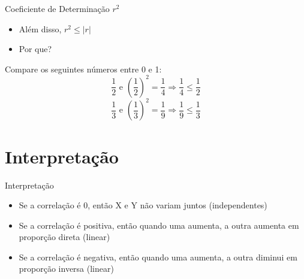 \documentclass{beamer}
\begin{document}
\begin{frame}{Coeficiente de Determinação $r^2$}
  \begin{itemize}
  \item Além disso, $r^2 \le |r|$
  \item Por que?
  \end{itemize}
  \begin{block}{}
    Compare os seguintes números entre 0 e 1:
    \begin{displaymath}
      \frac{1}{2} \text{ e } \left(\frac{1}{2}\right)^2=\frac{1}{4} \Rightarrow
      \frac{1}{4} \le \frac{1}{2}
    \end{displaymath}
    \begin{displaymath}
      \frac{1}{3} \text{ e } \left(\frac{1}{3}\right)^2=\frac{1}{9} \Rightarrow
      \frac{1}{9} \le \frac{1}{3}
    \end{displaymath}
  \end{block}
\end{frame}




\section{Interpretação}

\begin{frame}{Interpretação}
  \begin{itemize}
  \item Se a correlação é 0, então X e Y não variam juntos (independentes)
  \item Se a correlação é positiva, então quando uma aumenta, a outra
    aumenta em proporção direta (linear)
  \item Se a correlação é negativa, então quando uma aumenta, a outra
    diminui em proporção inversa (linear)
  \end{itemize}
\end{frame}
\end{document}
